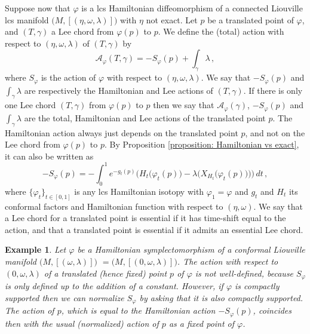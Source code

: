 \documentclass{amsart}
\newtheorem{example}[thm]{Example}
\theoremstyle{remark}
\begin{document}
Suppose now that $\varphi$ is a lcs Hamiltonian diffeomorphism
of a connected Liouville lcs manifold $\big(M , [(\eta, \omega, \lambda)]\big)$
with $\eta$ not exact.
Let $p$ be a translated point of $\varphi$,
and $(T, \gamma)$ a Lee chord from $\varphi(p)$ to $p$.
We define the (total) action
with respect to $(\eta, \omega, \lambda)$
of $(T, \gamma)$ by
\[
\mathcal{A}_{\varphi} (T, \gamma) = - S_{\varphi}(p) + \int_{\gamma} \lambda \,,
\]
where $S_{\varphi}$ is the action of $\varphi$
with respect to $(\eta, \omega, \lambda)$.
We say that $- S_{\varphi}(p)$ and $\int_{\gamma} \lambda$
are respectively the Hamiltonian and Lee actions of $(T, \gamma)$.
If there is only one Lee chord $(T, \gamma)$
from $\varphi (p)$ to $p$
then we say that $\mathcal{A}_\varphi (\gamma)$,
$- S_{\varphi}(p)$ and $\int_{\gamma} \lambda $
are the total, Hamiltonian and Lee actions
of the translated point $p$.
The Hamiltonian action always just depends
on the translated point $p$,
and not on the Lee chord from $\varphi (p)$ to $p$.
By Proposition \ref{proposition: Hamiltonian vs exact},
it can also be written as
\[
- S_{\varphi} (p) = - \int_0^1 e^{-g_t(p)} \Big( H_t \big(\varphi_t(p)\big)
- \lambda \big( X_{H_t} \big(\varphi_t(p)\big) \big) \Big) \, dt \,,
\]
where $\{\varphi_t\}_{t \in [0, 1]}$ is any lcs Hamiltonian isotopy
with $\varphi_1 = \varphi$
and $g_t$ and $H_t$ its conformal factors
and Hamiltonian function
with respect to $(\eta, \omega)$.
We say that a Lee chord for a translated point is essential
if it has time-shift equal to the action,
and that a translated point is essential
if it admits an essential Lee chord.

\begin{example}\label{example: action translated point symplectic}
Let $\varphi$ be a Hamiltonian symplectomorphism
of a conformal Liouville manifold
$\big(M, [(\omega, \lambda)] \big)$
$= \big(M, [(0, \omega, \lambda)]\big)$.
The action with respect to $(0, \omega, \lambda)$
of a translated (hence fixed) point $p$ of $\varphi$
is not well-defined,
because $S_{\varphi}$ is only defined up to the addition of a constant.
However,
if $\varphi$ is compactly supported
then we can normalize $S_{\varphi}$
by asking that it is also compactly supported.
The action of $p$,
which is equal to the Hamiltonian action $- S_{\varphi} (p)$,
coincides then with the usual (normalized) action of $p$
as a fixed point of $\varphi$.
\end{example}
\end{document}
